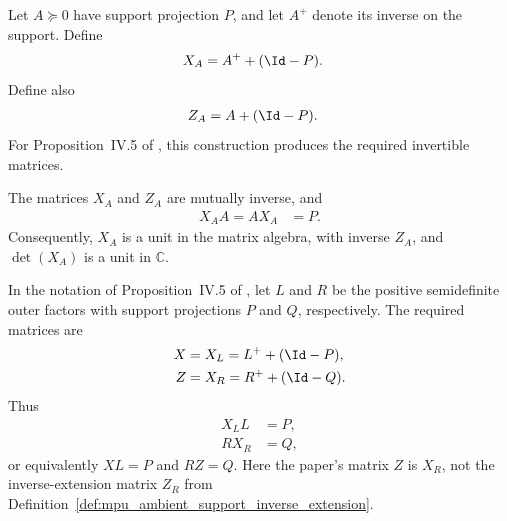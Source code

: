 \begin{definition}
    \label{def:mpu_ambient_support_inverse_extension}
    \leanok

    Let $A\succeq0$ have support projection $P$, and let $A^+$ denote its
    inverse on the support. Define
    \begin{align}
        X_A & =A^++(\Id-P).
    \end{align}
    Define also
    \begin{align}
        Z_A & =A+(\Id-P).
    \end{align}
    For Proposition~IV.5 of \cite{Cirac2017MPU}, this construction produces the required invertible
    matrices.
\end{definition}

\begin{lemma}
    \label{thm:mpu_ambient_support_inverse_extension}
    \leanok
    The matrices $X_A$ and $Z_A$ are mutually inverse, and
    \begin{align}
        X_AA=AX_A & =P.
    \end{align}
    Consequently, $X_A$ is a unit in the matrix algebra, with inverse $Z_A$,
    and $\det(X_A)$ is a unit in $\mathbb C$.

    In the notation of Proposition~IV.5 of \cite{Cirac2017MPU}, let $L$ and
    $R$ be the positive semidefinite outer factors with support projections
    $P$ and $Q$, respectively. The required matrices are
    \begin{align}
        X & =X_L=L^++(\Id-P), \\
        Z & =X_R=R^++(\Id-Q).
    \end{align}
    Thus
    \begin{align}
        X_L L & =P, \\
        R X_R & =Q,
    \end{align}
    or equivalently $XL=P$ and $RZ=Q$. Here the paper's matrix $Z$ is $X_R$,
    not the inverse-extension matrix $Z_R$ from
    Definition~\ref{def:mpu_ambient_support_inverse_extension}.
\end{lemma}

